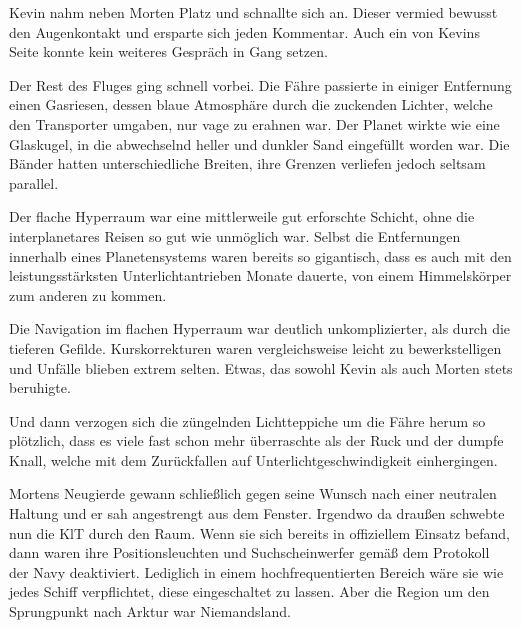 \par

Kevin nahm neben Morten Platz und schnallte sich an. Dieser vermied bewusst den Augenkontakt und ersparte sich jeden Kommentar. Auch ein  von Kevins Seite konnte kein weiteres Gespräch in Gang setzen.

\par

Der Rest des Fluges ging schnell vorbei. Die Fähre passierte in einiger Entfernung einen Gasriesen, dessen blaue Atmosphäre durch die zuckenden Lichter, welche den Transporter umgaben, nur vage zu erahnen war. Der Planet wirkte wie eine Glaskugel, in die abwechselnd heller und dunkler Sand eingefüllt worden war. Die Bänder hatten unterschiedliche Breiten, ihre Grenzen verliefen jedoch seltsam parallel.

\par

Der flache Hyperraum war eine mittlerweile gut erforschte Schicht, ohne die interplanetares Reisen so gut wie unmöglich war. Selbst die Entfernungen innerhalb eines Planetensystems waren bereits so gigantisch, dass es auch mit den leistungsstärksten Unterlichtantrieben Monate dauerte, von einem Himmelskörper zum anderen zu kommen.

\par

Die Navigation im flachen Hyperraum war deutlich unkomplizierter, als durch die tieferen Gefilde. Kurskorrekturen waren vergleichsweise leicht zu bewerkstelligen und Unfälle blieben extrem selten. Etwas, das sowohl Kevin als auch Morten stets beruhigte.

\par

Und dann verzogen sich die züngelnden Lichtteppiche um die Fähre herum so plötzlich, dass es viele fast schon mehr überraschte als der Ruck und der dumpfe Knall, welche mit dem Zurückfallen auf Unterlichtgeschwindigkeit einhergingen.

\par

Mortens Neugierde gewann schließlich gegen seine Wunsch nach einer neutralen Haltung und er sah angestrengt aus dem Fenster. Irgendwo da draußen schwebte nun die  KlT durch den Raum. Wenn sie sich bereits in offiziellem Einsatz befand, dann waren ihre Positionsleuchten und Suchscheinwerfer gemäß dem Protokoll der Navy deaktiviert. Lediglich in einem hochfrequentierten Bereich wäre sie wie jedes Schiff verpflichtet, diese eingeschaltet zu lassen. Aber die Region um den Sprungpunkt nach Arktur war Niemandsland.

